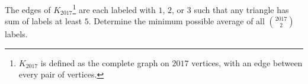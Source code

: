 The edges of $K_{2017}$\footnote{$K_{2017}$ is defined as the complete graph on $2017$ vertices, with an edge between every pair of vertices.} are each labeled with $1$, $2$, or $3$ such that any triangle has sum of labels at least $5$. Determine the minimum possible average of all $\binom{2017}{2}$ labels.
